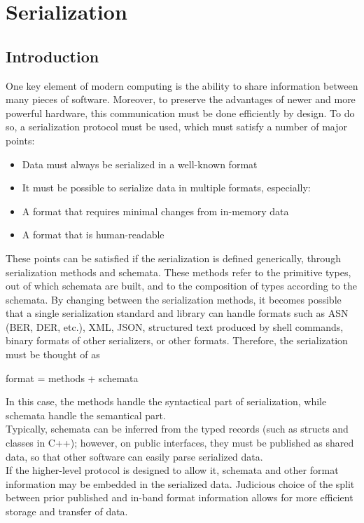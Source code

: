 \section{Serialization}
\subsection{Introduction}
One key element of modern computing is the ability to share information between many pieces of software. Moreover, to preserve the advantages of newer and more powerful hardware, this communication must be done efficiently by design. To do so, a serialization protocol must be used, which must satisfy a number of major points:
\begin{itemize}
	\item Data must always be serialized in a well-known format
	\item It must be possible to serialize data in multiple formats, especially:
	\item A format that requires minimal changes from in-memory data
	\item A format that is human-readable
\end{itemize}
These points can be satisfied if the serialization is defined generically, through serialization methods and schemata. These methods refer to the primitive types, out of which schemata are built, and to the composition of types according to the schemata. By changing between the serialization methods, it becomes possible that a single serialization standard and library can handle formats such as ASN (BER, DER, etc.), XML, JSON, structured text produced by shell commands, binary formats of other serializers, or other formats. Therefore, the serialization must be thought of as
\begin{center}
	format = methods + schemata
\end{center}
In this case, the methods handle the syntactical part of serialization, while schemata handle the semantical part.\\
Typically, schemata can be inferred from the typed records (such as structs and classes in C++); however, on public interfaces, they must be published as shared data, so that other software can easily parse serialized data.\\
If the higher-level protocol is designed to allow it, schemata and other format information may be embedded in the serialized data. Judicious choice of the split between prior published and in-band format information allows for more efficient storage and transfer of data.
